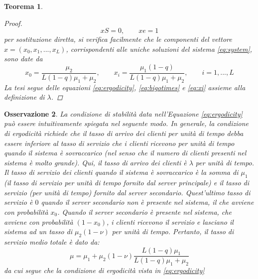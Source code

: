 \documentclass[11pt]{article}
\newtheorem{teorema}{Teorema}[section]
\newtheorem{osservazione}[teorema]{Osservazione}
\begin{document}
\begin{teorema}
\begin{proof}
        \begin{equation}\label{eq:system}
            xS = 0, \qquad xe = 1
        \end{equation}
        per sostituzione diretta, si verifica facilmente che le componenti del vettore $x = (x_0, x_1, ... , x_L)$, corrispondenti alle uniche soluzioni del sistema \ref{eq:system}, sono date da
        \begin{equation}\label{eq:xi}
            x_0 = \frac{\mu_2}{L(1-q)\mu_1 + \mu_2}, \qquad x_i = \frac{\mu_1(1-q)}{L(1-q)\mu_1 + \mu_2}, \qquad i = 1, ..., L
        \end{equation}
        La tesi segue delle equazioni \ref{eq:ergodicity}, \ref{eq:bigotimes} e \ref{eq:xi} assieme alla definizione di $\lambda$.
    \end{proof}

\end{teorema}

\begin{osservazione}
    La condizione di stabilità data nell'Equazione \ref{eq:ergodicity} può essere intuitivamente spiegata nel seguente modo. In generale, la condizione di ergodicità richiede che il tasso di arrivo dei clienti per unità di tempo debba essere inferiore al tasso di servizio che i clienti ricevono per unità di tempo quando il sistema è sovraccarico (nel senso che il numero di clienti presenti nel sistema è molto grande). Qui, il tasso di arrivo dei clienti è $\lambda$ per unità di tempo. Il tasso di servizio dei clienti quando il sistema è sovraccarico è la somma di $\mu_1$ (il tasso di servizio per unità di tempo fornito dal server principale) e il tasso di servizio (per unità di tempo) fornito dal server secondario. Quest'ultimo tasso di servizio è $0$ quando il server secondario non è presente nel sistema, il che avviene con probabilità $x_0$. Quando il server secondario è presente nel sistema, che avviene con probabilità $(1 - x_0)$, i clienti ricevono il servizio e lasciano il sistema ad un tasso di $\mu_2 (1 - \nu)$ per unità di tempo. Pertanto, il tasso di servizio medio totale è dato da:
    \begin{equation}
        \mu = \mu_1 + \mu_2(1 - \nu) \frac{L(1-q)\mu_1}{L(1-q)\mu_1 + \mu_2}
    \end{equation}
    da cui segue che la condizione di ergodicità vista in \ref{eq:ergodicity}
\end{osservazione}
\end{document}

